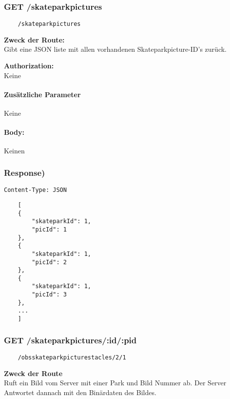 \label{/skateparkpictures}

\subsubsection{GET /skateparkpictures}

\begin{lstlisting}
    /skateparkpictures
\end{lstlisting}

\textbf{Zweck der Route:} \\
Gibt  eine JSON liste mit allen vorhandenen Skateparkpicture-ID's zurück.

\textbf{Authorization:} \\
Keine

\paragraph{Zusätzliche Parameter}
Keine

\paragraph{Body:}

Keinen

\subsubsection{Response)}

\lstinline{Content-Type: JSON}
\begin{lstlisting}
    [
    {
        "skateparkId": 1,
        "picId": 1
    },
    {
        "skateparkId": 1,
        "picId": 2
    },
    {
        "skateparkId": 1,
        "picId": 3
    },
    ... 
    ]
\end{lstlisting}

\pagebreak

\subsubsection{GET /skateparkpictures/:id/:pid}

\begin{lstlisting}
    /obsskateparkpicturestacles/2/1
\end{lstlisting}

\textbf{Zweck der Route} \\
Ruft ein Bild vom Server mit einer Park und Bild Nummer ab. Der Server Antwortet
dannach mit den Binärdaten des Bildes.




